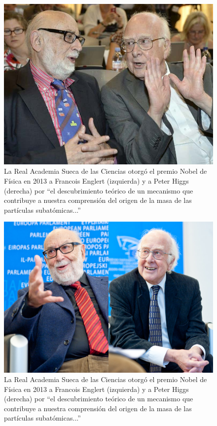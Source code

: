 \documentclass[12pt,a4paper]{report}
\begin{document}
\begin{figure}
\includegraphics[scale=0.5]{images/higgs_englert2.jpeg}
\caption{La Real Academia Sueca de las Ciencias otorg\'o el premio Nobel de F\'isica en 2013 a Francois Englert (izquierda) y a Peter Higgs (derecha) por ``el descubrimiento te\'orico de un mecanismo que contribuye a nuestra comprensi\'on del origen de la masa de las part\'iculas subat\'omicas...''}
\end{figure}

\begin{figure}
\includegraphics[scale=1]{images/higgs_englert3.jpeg}
\caption{La Real Academia Sueca de las Ciencias otorg\'o el premio Nobel de F\'isica en 2013 a Francois Englert (izquierda) y a Peter Higgs (derecha) por ``el descubrimiento te\'orico de un mecanismo que contribuye a nuestra comprensi\'on del origen de la masa de las part\'iculas subat\'omicas...''}
\end{figure}
\end{document}
